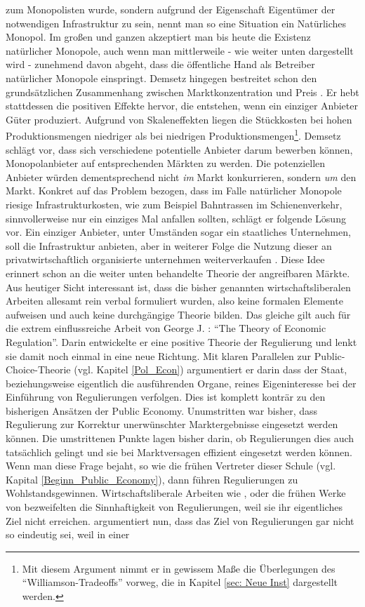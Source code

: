 zum Monopolisten wurde, sondern aufgrund der Eigenschaft Eigentümer der notwendigen Infrastruktur zu sein, nennt man so eine Situation ein Natürliches Monopol. Im großen und ganzen akzeptiert man bis heute die Existenz natürlicher Monopole, auch wenn man mittlerweile - wie weiter unten dargestellt wird - zunehmend davon abgeht, dass die öffentliche Hand als Betreiber natürlicher Monopole einspringt. Demsetz hingegen bestreitet schon den grundsätzlichen Zusammenhang zwischen Marktkonzentration und Preis \parencite[S. 60]{Demsetz1968}. Er hebt stattdessen die positiven Effekte hervor, die entstehen, wenn ein einziger Anbieter Güter produziert. Aufgrund von Skaleneffekten liegen die Stückkosten bei hohen Produktionsmengen niedriger als bei niedrigen Produktionsmengen\footnote{Mit diesem Argument nimmt er in gewissem Maße die Überlegungen des "`Williamson-Tradeoffs"' vorweg, die in Kapitel \ref{sec: Neue Inst} dargestellt werden.}\parencite[S. 57]{Demsetz1968}. Demsetz schlägt vor, dass sich verschiedene potentielle Anbieter darum bewerben können, Monopolanbieter auf entsprechenden Märkten zu werden. Die potenziellen Anbieter würden dementsprechend nicht \textit{im} Markt konkurrieren, sondern \textit{um} den Markt. Konkret auf das Problem bezogen, dass im Falle natürlicher Monopole riesige Infrastrukturkosten, wie zum Beispiel Bahntrassen im Schienenverkehr, sinnvollerweise nur ein einziges Mal anfallen sollten, schlägt er folgende Lösung vor. Ein einziger Anbieter, unter Umständen sogar ein staatliches Unternehmen, soll die Infrastruktur anbieten, aber in weiterer Folge die Nutzung dieser an privatwirtschaftlich organisierte unternehmen weiterverkaufen \parencite[S. 62]{Demsetz1968}. Diese Idee erinnert schon an die weiter unten behandelte Theorie der angreifbaren Märkte. Aus heutiger Sicht interessant ist, dass die bisher genannten wirtschaftsliberalen Arbeiten allesamt rein verbal formuliert wurden, also keine formalen Elemente aufweisen und auch keine durchgängige Theorie bilden. Das gleiche gilt auch für die extrem einflussreiche Arbeit von George J. \textcite{Stigler1971}: "`The Theory of Economic Regulation"'. Darin entwickelte er eine positive Theorie der Regulierung und lenkt sie damit noch einmal in eine neue Richtung. Mit klaren Parallelen zur Public-Choice-Theorie (vgl. Kapitel \ref{Pol_Econ}) argumentiert er darin dass der Staat, beziehungsweise eigentlich die ausführenden Organe, reines Eigeninteresse bei der Einführung von Regulierungen verfolgen. Dies ist komplett konträr zu den bisherigen Ansätzen der Public Economy. Unumstritten war bisher, dass Regulierung zur Korrektur unerwünschter Marktergebnisse eingesetzt werden können. Die umstrittenen Punkte lagen bisher darin, ob Regulierungen dies auch tatsächlich gelingt und sie bei Marktversagen effizient eingesetzt werden können. Wenn man diese Frage bejaht, so wie die frühen Vertreter dieser Schule (vgl. Kapital \ref{Beginn_Public_Economy}), dann führen Regulierungen zu Wohlstandsgewinnen. Wirtschaftsliberale Arbeiten wie \textcite{Demsetz1968}, oder die frühen Werke von \textcite{Stigler1962} bezweifelten die Sinnhaftigkeit von Regulierungen, weil sie ihr eigentliches Ziel nicht erreichen. \textcite{Stigler1971} argumentiert nun, dass das Ziel von Regulierungen gar nicht so eindeutig sei, weil in einer 
